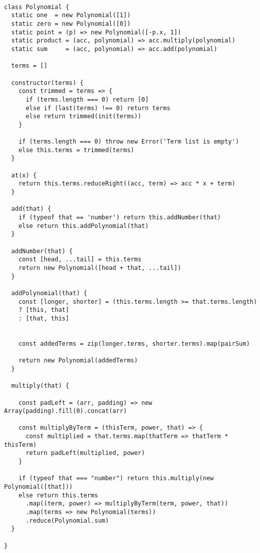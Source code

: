 \documentclass[12pt]{article}
\begin{document}
\begin{verbatim}

class Polynomial {
  static one  = new Polynomial([1])
  static zero = new Polynomial([0])
  static point = (p) => new Polynomial([-p.x, 1])
  static product = (acc, polynomial) => acc.multiply(polynomial)
  static sum     = (acc, polynomial) => acc.add(polynomial)

  terms = []

  constructor(terms) {
    const trimmed = terms => {
      if (terms.length === 0) return [0]
      else if (last(terms) !== 0) return terms
      else return trimmed(init(terms))
    }

    if (terms.length === 0) throw new Error('Term list is empty')
    else this.terms = trimmed(terms)
  }

  at(x) {
    return this.terms.reduceRight((acc, term) => acc * x + term)
  }

  add(that) {
    if (typeof that == 'number') return this.addNumber(that)
    else return this.addPolynomial(that)
  }

  addNumber(that) {
    const [head, ...tail] = this.terms
    return new Polynomial([head + that, ...tail])
  }

  addPolynomial(that) {
    const [longer, shorter] = (this.terms.length >= that.terms.length)
    ? [this, that]
    : [that, this]

    
    const addedTerms = zip(longer.terms, shorter.terms).map(pairSum)

    return new Polynomial(addedTerms)
  }

  multiply(that) {
     
    const padLeft = (arr, padding) => new Array(padding).fill(0).concat(arr)

    const multiplyByTerm = (thisTerm, power, that) => {
      const multiplied = that.terms.map(thatTerm => thatTerm * thisTerm)
      return padLeft(multiplied, power)
    }

    if (typeof that === "number") return this.multiply(new Polynomial([that]))
    else return this.terms
      .map((term, power) => multiplyByTerm(term, power, that))
      .map(terms => new Polynomial(terms))
      .reduce(Polynomial.sum)
  }

}
\end{verbatim}
\end{document}
